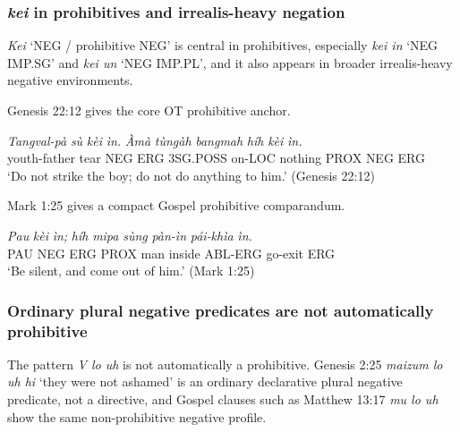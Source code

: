 \documentclass[
  11pt,
  a4paper,
]{article}
\newcommand{\tdim}[1]{\textit{#1}}
\newcommand{\tdimword}[1]{\textit{#1}}
\renewcommand{\textsc}[1]{{\footnotesize\MakeUppercase{#1}}}
\newcommand{\glossquote}[1]{`#1'}
\begin{document}
\subsubsection{\texorpdfstring{\tdim{kei} in prohibitives and
irrealis-heavy
negation}{ in prohibitives and irrealis-heavy negation}}\label{in-prohibitives-and-irrealis-heavy-negation}

\tdim{Kei} \glossquote{NEG / prohibitive NEG} is central in
prohibitives, especially \tdim{kei in} \glossquote{NEG IMP.SG} and
\tdim{kei un} \glossquote{NEG IMP.PL}, and it also appears in broader
irrealis-heavy negative environments.

Genesis 22:12 gives the core OT prohibitive anchor.

\begin{exe}
\ex \label{ex:neg-kei}
\gll \tdimword{Tangval-pà} \tdimword{sù} \tdimword{kèi} \tdimword{ìn.} \tdimword{Àmà} \tdimword{tùngàh} \tdimword{bangmah} \tdimword{híh} \tdimword{kèi} \tdimword{ìn.} \\
     youth-father tear \textsc{neg} \textsc{erg} \textsc{3sg}.\textsc{poss} on-\textsc{loc} nothing \textsc{prox} \textsc{neg} \textsc{erg} \\
\glt \glossquote{Do not strike the boy; do not do anything to him.} (Genesis 22:12)
\end{exe}

Mark 1:25 gives a compact Gospel prohibitive comparandum.

\begin{exe}
\ex \label{ex:neg-kei-mark1-25}
\gll \tdimword{Pau} \tdimword{kèi} \tdimword{ìn;} \tdimword{híh} \tdimword{mipa} \tdimword{sùng} \tdimword{pàn-ìn} \tdimword{pái-khìa} \tdimword{ìn.} \\
     \textsc{pau} \textsc{neg} \textsc{erg} \textsc{prox} man inside \textsc{abl}-\textsc{erg} go-exit \textsc{erg} \\
\glt \glossquote{Be silent, and come out of him.} (Mark 1:25)
\end{exe}

\subsubsection{Ordinary plural negative predicates are not automatically
prohibitive}\label{ordinary-plural-negative-predicates-are-not-automatically-prohibitive}

The pattern \tdim{V lo uh} is not automatically a prohibitive. Genesis
2:25 \tdim{maizum lo uh hi} \glossquote{they were not ashamed} is an
ordinary declarative plural negative predicate, not a directive, and
Gospel clauses such as Matthew 13:17 \tdim{mu lo uh} show the same
non-prohibitive negative profile.
\end{document}

